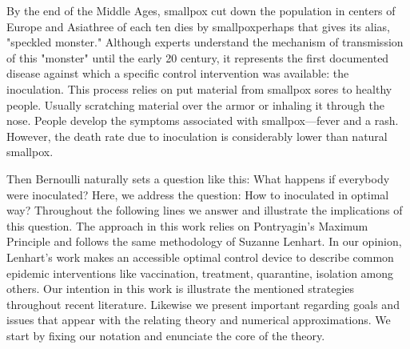   By the end of the Middle Ages, smallpox cut down the 
population in centers of Europe and Asia\textemdash three of each ten dies by 
smallpox\textemdash perhaps that gives its alias, "speckled monster."  
Although experts understand the mechanism of transmission of this  "monster"
until the early 20  century, it represents the first documented disease
\citep[][]{bernoulli1760essai, bradley1971smallpox, Foppa2017} against which a
specific control intervention was available: the inoculation. This process
relies on put material from smallpox sores to healthy people. Usually scratching
material over the armor or inhaling it through the nose. People develop the
symptoms associated with smallpox---fever and a rash. However, the death rate
due to inoculation is considerably lower than natural smallpox.

  Then Bernoulli naturally sets a question like this: What happens
if everybody were inoculated? Here, we address the question: How to 
inoculated in optimal way? Throughout the following lines we answer and 
illustrate the implications of this question.
The approach in this work relies on Pontryagin's Maximum Principle
\cite{Boltyanski1960} and follows the same methodology of Suzanne Lenhart.
In our opinion, Lenhart's work makes an accessible optimal control device to
describe common epidemic interventions like vaccination, treatment, 
quarantine, isolation among others. Our intention in this work is illustrate 
the mentioned strategies throughout recent literature. Likewise we present 
important regarding goals and issues that appear with the relating theory and 
numerical approximations. We start by fixing our notation and enunciate the core
of the theory.
